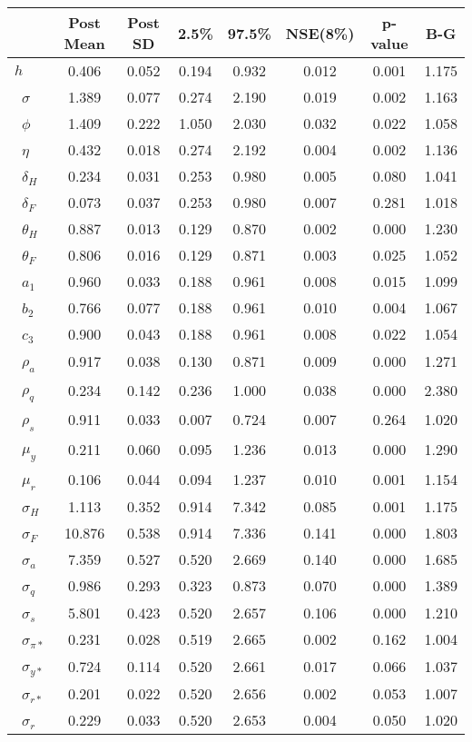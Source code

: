 \begin{tiny}\begin{tabular}{lccccccc}
\hline
&\textbf{Post Mean}&\textbf{Post SD}&\textbf{2.5\%}&\textbf{97.5\%}&\textbf{NSE(8\%)}&\textbf{p-value}&\textbf{B-G}\\\hline
\textbf{$ h             $}&0.406&0.052&0.194&0.932&0.012&0.001&1.175\\\
\textbf{$ \sigma        $}&1.389&0.077&0.274&2.190&0.019&0.002&1.163\\\
\textbf{$ \phi          $}&1.409&0.222&1.050&2.030&0.032&0.022&1.058\\\
\textbf{$ \eta          $}&0.432&0.018&0.274&2.192&0.004&0.002&1.136\\\
\textbf{$ \delta_{H}    $}&0.234&0.031&0.253&0.980&0.005&0.080&1.041\\\
\textbf{$ \delta_{F}    $}&0.073&0.037&0.253&0.980&0.007&0.281&1.018\\\
\textbf{$ \theta_{H}    $}&0.887&0.013&0.129&0.870&0.002&0.000&1.230\\\
\textbf{$ \theta_{F}    $}&0.806&0.016&0.129&0.871&0.003&0.025&1.052\\\
\textbf{$ a_{1}         $}&0.960&0.033&0.188&0.961&0.008&0.015&1.099\\\
\textbf{$ b_{2}         $}&0.766&0.077&0.188&0.961&0.010&0.004&1.067\\\
\textbf{$ c_{3}         $}&0.900&0.043&0.188&0.961&0.008&0.022&1.054\\\
\textbf{$ \rho_{a}      $}&0.917&0.038&0.130&0.871&0.009&0.000&1.271\\\
\textbf{$ \rho_{q}      $}&0.234&0.142&0.236&1.000&0.038&0.000&2.380\\\
\textbf{$ \rho_{s}      $}&0.911&0.033&0.007&0.724&0.007&0.264&1.020\\\
\textbf{$ \mu_{y}       $}&0.211&0.060&0.095&1.236&0.013&0.000&1.290\\\
\textbf{$ \mu_{r}       $}&0.106&0.044&0.094&1.237&0.010&0.001&1.154\\\
\textbf{$ \sigma_{H}    $}&1.113&0.352&0.914&7.342&0.085&0.001&1.175\\\
\textbf{$ \sigma_{F}    $}&10.876&0.538&0.914&7.336&0.141&0.000&1.803\\\
\textbf{$ \sigma_{a}    $}&7.359&0.527&0.520&2.669&0.140&0.000&1.685\\\
\textbf{$ \sigma_{q}    $}&0.986&0.293&0.323&0.873&0.070&0.000&1.389\\\
\textbf{$ \sigma_{s}    $}&5.801&0.423&0.520&2.657&0.106&0.000&1.210\\\
\textbf{$ \sigma_{\pi*} $}&0.231&0.028&0.519&2.665&0.002&0.162&1.004\\\
\textbf{$ \sigma_{y*}   $}&0.724&0.114&0.520&2.661&0.017&0.066&1.037\\\
\textbf{$ \sigma_{r*}   $}&0.201&0.022&0.520&2.656&0.002&0.053&1.007\\\
\textbf{$ \sigma_{r}    $}&0.229&0.033&0.520&2.653&0.004&0.050&1.020\\\hline
\end{tabular}
\end{tiny}